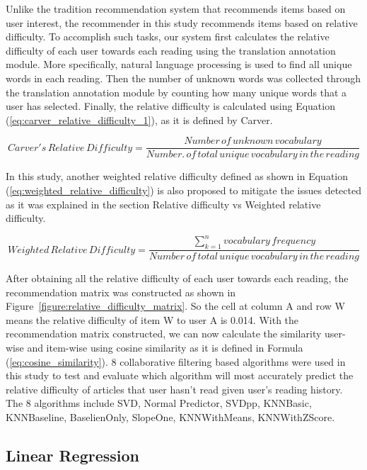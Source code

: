 Unlike the tradition recommendation system that recommends items based on user interest, the recommender in this study recommends items based on relative difficulty. To accomplish such tasks, our system first calculates the relative difficulty of each user towards each reading using the translation annotation module. More specifically, natural language processing is used to find all unique words in each reading. Then the number of unknown words was collected through the translation annotation module by counting how many unique words that a user has selected. Finally, the relative difficulty is calculated using Equation (\ref{eq:carver_relative_difficulty_1}), as it is defined by Carver.

\begin{equation}\label{eq:carver_relative_difficulty_1}
   Carver's \, Relative \, Difficulty = \frac{Number \, of \, unknown \, vocabulary}{Number. \, of \, total \, unique \,vocabulary \, in \, the \, reading}
\end{equation}

In this study, another weighted relative difficulty defined as shown in Equation (\ref{eq:weighted_relative_difficulty}) is also proposed to mitigate the issues detected as it was explained in the section Relative difficulty vs Weighted relative difficulty.

\begin{equation}\label{eq:weighted_relative_difficulty}
 Weighted \, Relative \, Difficulty = \frac{\sum_{k = 1}^{n} vocabulary \, frequency}{Number \, of \, total \, unique \,vocabulary \, in \, the \, reading}
\end{equation}

After obtaining all the relative difficulty of each user towards each reading, the recommendation matrix was constructed as shown in Figure~\ref{figure:relative_difficulty_matrix}. So the cell at column A and row W means the relative difficulty of item W to user A is 0.014. With the recommendation matrix constructed, we can now calculate the similarity user-wise and item-wise using cosine similarity as it is defined in Formula (\ref{eq:cosine_similarity}). 8 collaborative filtering based algorithms were used in this study to test and evaluate which algorithm will most accurately predict the relative difficulty of articles that user hasn't read given user's reading history. The 8 algorithms include SVD, Normal Predictor, SVDpp, KNNBasic, KNNBaseline, BaselienOnly, SlopeOne, KNNWithMeans, KNNWithZScore. 

\subsection{Linear Regression}

